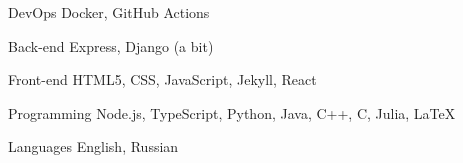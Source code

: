 

\begin{cvskills}

  \cvskill
    {DevOps} %
    {Docker, GitHub Actions} %

  \cvskill
    {Back-end} %
    {Express, Django (a bit)} %

  \cvskill
    {Front-end} %
    {HTML5, CSS, JavaScript, Jekyll, React} %

  \cvskill
    {Programming} %
    {Node.js, TypeScript, Python, Java, C++, C, Julia, LaTeX} %

  \cvskill
    {Languages} %
    {English, Russian} %

\end{cvskills}
